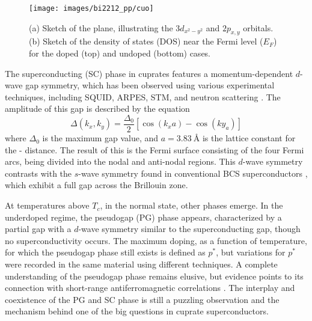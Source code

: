 \begin{figure}[b]
	\centering
	\texttt{[image: images/bi2212\_pp/cuo]}
	\caption{(a) Sketch of the  plane, illustrating the  $3d_{x^2-y^2}$ and  $2p_{x,y}$ orbitals. (b) Sketch of the density of states (DOS) near the Fermi level ($E_F$) for the doped (top) and undoped (bottom) cases.}
	\label{fig:cuo_dos}
\end{figure}

The superconducting (SC) phase in cuprates features a momentum-dependent $d$-wave gap symmetry, which has been observed using various experimental techniques, including SQUID, ARPES, STM, and neutron scattering \cite{wollman_experimental_1993, tsuei_pairing_1994, tsuei_pairing_1996, shen_anomalously_1993, ding_angle-resolved_1996, chen_unconventional_2022, renner_vacuum_1995, pan_microscopic_2001, gu_directly_2019, devereaux_electronic_1994, sacuto_nodes_1997, fong_neutron_1999}.
The amplitude of this gap is described by the equation
\begin{equation}
	\Delta(k_x,k_y) = \frac{\Delta_0}{2}\left[\cos(k_xa)-\cos(ky_a)\right]
\end{equation}
where $\Delta_0$ is the maximum gap value, and $a = \qty{3.83}{\angstrom}$ is the lattice constant for the - distance.
The result of this is the Fermi surface consisting of the four Fermi arcs, being divided into the nodal and anti-nodal regions.
This $d$-wave symmetry contrasts with the $s$-wave symmetry found in conventional BCS superconductors \cite{bardeen_theory_1957}, which exhibit a full gap across the Brillouin zone.

At temperatures above $T_c$, in the normal state, other phases emerge.
In the underdoped regime, the pseudogap (PG) phase appears, characterized by a partial gap with a $d$-wave symmetry similar to the superconducting gap, though no superconductivity occurs.
The maximum doping, as a function of temperature, for which the pseudogap phase still exists is defined as $p^*$, but variations for $p^*$ were recorded in the same material using different techniques.
A complete understanding of the pseudogap phase remains elusive, but evidence points to its connection with short-range antiferromagnetic correlations \cite{zhang_effective_1988, rice_theory_1973}.
The interplay and coexistence of the PG and SC phase is still a puzzling observation and the mechanism behind one of the big questions in cuprate superconductors.

